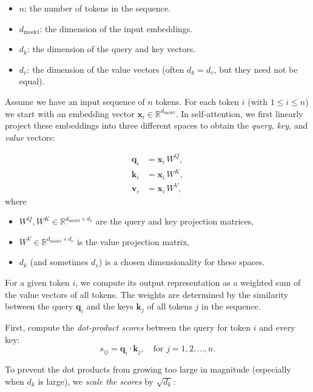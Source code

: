 \begin{itemize}
	\item \( n \): the number of tokens in the sequence.
	\item \( d_{\text{model}} \): the dimension of the input embeddings.
	\item \( d_k \): the dimension of the query and key vectors.
	\item \( d_v \): the dimension of the value vectors (often \( d_k = d_v \), but they need not be equal).
\end{itemize}

Assume we have an input sequence of \( n \) tokens. For each token \( i \) (with \( 1 \leq i \leq n \)) we start with an embedding vector \( \mathbf{x}_i \in \mathbb{R}^{d_{\text{model}}} \). In self‐attention, we first linearly project these embeddings into three different spaces to obtain the \textit{query}, \textit{key}, and \textit{value} vectors:

\[
\begin{aligned}
\mathbf{q}_i &= \mathbf{x}_i \, W^Q, \\
\mathbf{k}_i &= \mathbf{x}_i \, W^K, \\
\mathbf{v}_i &= \mathbf{x}_i \, W^V,
\end{aligned}
\]
where
\begin{itemize}
	\item \( W^Q, W^K \in \mathbb{R}^{d_{\text{model}} \times d_k} \) are the query and key projection matrices,
	\item \( W^V \in \mathbb{R}^{d_{\text{model}} \times d_v} \) is the value projection matrix,
	\item \( d_k \) (and sometimes \( d_v \)) is a chosen dimensionality for these spaces.
\end{itemize}

For a given token \( i \), we compute its output representation as a weighted sum of the value vectors of all tokens. The weights are determined by the similarity between the query \( \mathbf{q}_i \) and the keys \( \mathbf{k}_j \) of all tokens \( j \) in the sequence.

First, compute the \textit{dot-product scores} between the query for token \( i \) and every key:
\[
s_{ij} = \mathbf{q}_i \cdot \mathbf{k}_j, \quad \text{for } j = 1, 2, \dots, n.
\]

To prevent the dot products from growing too large in magnitude (especially when \( d_k \) is large), we \textit{scale the scores} by \( \sqrt{d_k} \):


